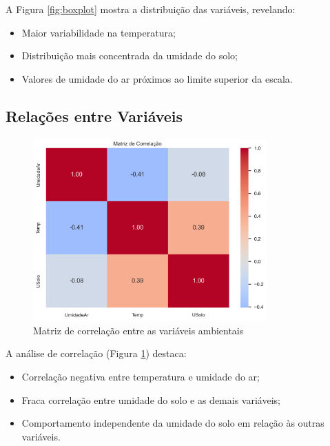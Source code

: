 \documentclass[12pt, a4paper]{article}
\begin{document}
A Figura \ref{fig:boxplot} mostra a distribuição das variáveis, revelando:
\begin{itemize}
    \item Maior variabilidade na temperatura;
    \item Distribuição mais concentrada da umidade do solo;
    \item Valores de umidade do ar próximos ao limite superior da escala.
\end{itemize}

\subsection{Relações entre Variáveis}
\begin{figure}[H]
\centering
\includegraphics[width=0.8\textwidth]{graficos/matriz_correlacao.png}
\caption{Matriz de correlação entre as variáveis ambientais}
\label{fig:correlacao}
\end{figure}

A análise de correlação (Figura \ref{fig:correlacao}) destaca:
\begin{itemize}
    \item Correlação negativa entre temperatura e umidade do ar;
    \item Fraca correlação entre umidade do solo e as demais variáveis;
    \item Comportamento independente da umidade do solo em relação às outras variáveis.
\end{itemize}
\end{document}
